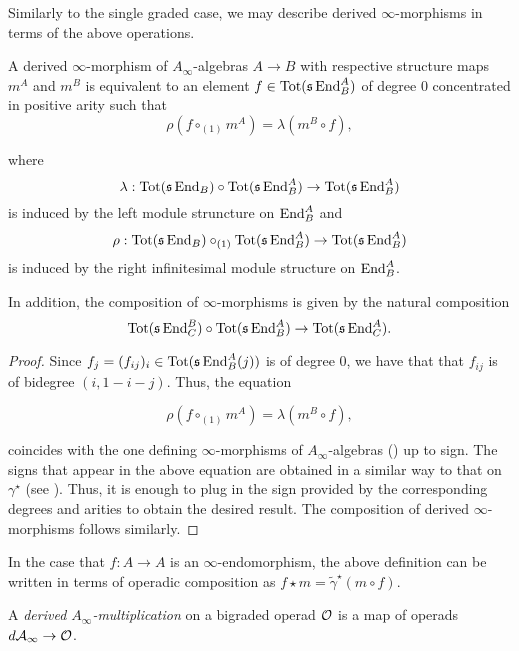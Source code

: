 \documentclass[twoside]{article}
\begin{document}
Similarly to the single graded case, we may describe derived $\infty$-morphisms in terms of the above operations.

\begin{lem}\label{dinfinitymorphism}
A derived $\infty$-morphism of $A_\infty$-algebras $A\to B$ with respective structure maps $m^A$ and $m^B$ is equivalent to an element $f\in\mathrm{Tot}(\mathfrak{s}\operatorname{End}^A_B)$ of degree 0 concentrated in positive arity such that \[\rho(f\circ_{(1)}m^A)=\lambda(m^B\circ f),\] 

where \[\lambda:\mathrm{Tot}(\mathfrak{s}\operatorname{End}_B)\circ \mathrm{Tot}(\mathfrak{s}\operatorname{End}^A_B)\to \mathrm{Tot}(\mathfrak{s}\operatorname{End}^A_B)\] is induced by the left module struncture on $\operatorname{End}^A_B$ and \[\rho:\mathrm{Tot}(\mathfrak{s}\operatorname{End}_B)\circ_{(1)}\mathrm{Tot}(\mathfrak{s}\operatorname{End}^A_B)\to \mathrm{Tot}(\mathfrak{s}\operatorname{End}^A_B)\] is induced by the right infinitesimal module structure on $\operatorname{End}^A_B$. 

In addition, the composition of $\infty$-morphisms is given by the natural composition \[\mathrm{Tot}(\mathfrak{s}\operatorname{End}^B_C)\circ \mathrm{Tot}(\mathfrak{s}\operatorname{End}^A_B)\to \mathrm{Tot}(\mathfrak{s}\operatorname{End}^A_C).\]
\end{lem}
\begin{proof}
Since $f_j=(f_{ij})_i\in\mathrm{Tot}(\mathfrak{s}\operatorname{End}^A_B(j))$ is of degree $0$, we have that that $f_{ij}$ is of bidegree $(i,1-i-j)$. Thus, the equation

\[\rho(f\circ_{(1)}m^A)=\lambda(m^B\circ f),\] 

coincides with the one defining $\infty$-morphisms of $A_\infty$-algebras () up to sign. The signs that appear in the above equation are obtained in a similar way to that on $\gamma^\star$ (see ). Thus, it is enough to plug in the sign provided by  the corresponding degrees and arities to obtain the desired result. The composition of derived $\infty$-morphisms follows similarly.
\end{proof}

In the case that $f:A\to A$ is an $\infty$-endomorphism, the above definition can be written in terms of operadic composition as $f\star m=\tilde\gamma^\star(m\circ f)$. 


\begin{defin}
A \emph{derived $A_\infty$-multiplication} on a bigraded operad ${\mathcal O}$ is a map of operads $d\mathcal{A}_\infty\to{\mathcal O}$.
\end{defin}
\end{document}
